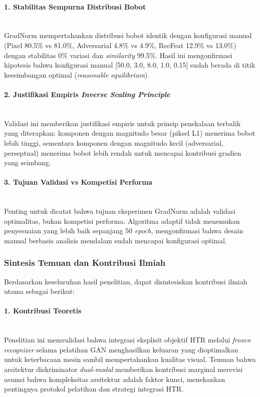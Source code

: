 \documentclass[12pt,a4paper]{article}
\begin{document}
\paragraph{1. Stabilitas Sempurna Distribusi Bobot} \mbox{}\\[0.1em]
GradNorm mempertahankan distribusi bobot identik dengan konfigurasi manual (Pixel 80.5\% vs 81.0\%, Adversarial 4.8\% vs 4.9\%, RecFeat 12.9\% vs 13.0\%) dengan stabilitas 0\% variasi dan \textit{similarity} 99.5\%. Hasil ini mengonfirmasi hipotesis bahwa konfigurasi manual [50.0, 3.0, 8.0, 1.0, 0.15] sudah berada di titik keseimbangan optimal (\textit{reasonable equilibrium}).

\paragraph{2. Justifikasi Empiris \textit{Inverse Scaling Principle}} \mbox{}\\[0.1em]
Validasi ini memberikan justifikasi empiris untuk prinsip penskalaan terbalik yang diterapkan: komponen dengan magnitudo besar (piksel L1) menerima bobot lebih tinggi, sementara komponen dengan magnitudo kecil (adversarial, perseptual) menerima bobot lebih rendah untuk mencapai kontribusi gradien yang seimbang.

\paragraph{3. Tujuan Validasi vs Kompetisi Performa} \mbox{}\\[0.1em]
Penting untuk dicatat bahwa tujuan eksperimen GradNorm adalah validasi optimalitas, bukan kompetisi performa. Algoritma adaptif tidak menemukan penyesuaian yang lebih baik sepanjang 50 \textit{epoch}, mengonfirmasi bahwa desain manual berbasis analisis mendalam sudah mencapai konfigurasi optimal.

\vspace{0.8em}

\subsubsection{Sintesis Temuan dan Kontribusi Ilmiah}
\label{subsubsec:sintesis-kontribusi}

Berdasarkan keseluruhan hasil penelitian, dapat disintesiskan kontribusi ilmiah utama sebagai berikut:

\paragraph{1. Kontribusi Teoretis} \mbox{}\\[0.1em]
Penelitian ini memvalidasi bahwa integrasi eksplisit objektif HTR melalui \textit{frozen recognizer} selama pelatihan GAN menghasilkan keluaran yang dioptimalkan untuk keterbacaan mesin sambil mempertahankan kualitas visual. Temuan bahwa arsitektur diskriminator \textit{dual-modal} memberikan kontribusi marginal merevisi asumsi bahwa kompleksitas arsitektur adalah faktor kunci, menekankan pentingnya protokol pelatihan dan strategi integrasi HTR.
\end{document}
